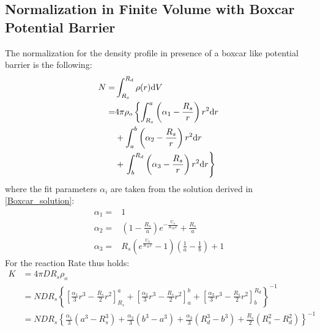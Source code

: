 \subsection{Normalization in Finite Volume with Boxcar Potential Barrier}
The normalization for the density profile in presence of a boxcar like potential barrier is the following:
\begin{align}
    N =& \int_{R_s}^{R_d} \rho(r) {\rm d} V  \\
    =& 4 \pi \rho_o \left\{ \int_{R_s} ^{a} \left( \alpha_1 - \frac{R_s}{r} \right) r^{2} {\rm d} r \right.\nonumber \\
    & +  \int_{a} ^{b} \left( \alpha_2 - \frac{R_s}{r} \right) r^{2} {\rm d} r \nonumber \\
    & + \left. \int_{b} ^{R_d} \left( \alpha_3 - \frac{R_s}{r} \right) r^{2} {\rm d} r\right\} 
    \label{cp_normalization}
\end{align}
where the fit parameters $\alpha_i$ are taken from the solution derived in \eqref{Boxcar_solution}:
\begin{align}
    \alpha_1 =& 1 \\
    \alpha_2 =&  \left( 1 - \frac{R_s}{a} \right) e^{-\frac{U_o}{K_B T}} + \frac{R_s}{a} \\
    \alpha_3 =& R_s \left(e^{\frac{U_0}{K_B T}} - 1\right) \left( \frac{1}{a} - \frac{1}{b} \right) + 1
    \label{fit_parameters}
\end{align}
For the reaction Rate thus holds:
\begin{align}
    K &= 4 \pi D R_s \rho_o \nonumber \\
    &= N D R_s \left\{ \left[\frac{\alpha_1}{3}r^{3} - \frac{R_s}{2}r^{2}\right]_{R_s}^{a} + \left[\frac{\alpha_2}{3}r^{3} - \frac{R_s}{2}r^{2}\right]_{a}^{b} + \left[\frac{\alpha_3}{3}r^{3} - \frac{R_s}{2}r^{2}\right]_{b}^{R_d}  \right\} ^{-1} \nonumber \\
    &= N D R_s \left\{ \frac{\alpha_1}{3}\left( a^{3} - R_s^{3} \right) + \frac{\alpha_2}{3}\left( b^{3} - a^{3} \right) + \frac{\alpha_3}{3}\left( R_d^{3} - b^{3} \right) + \frac{R_s}{2}\left( R_s^{2} - R_d^{2} \right) \right\}^{-1}
    \label{cp_rate}
\end{align}
